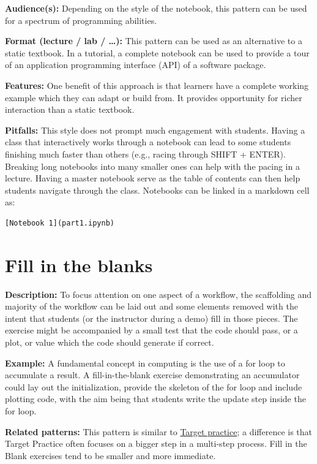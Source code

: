 \documentclass[]{book}
\begin{document}
\textbf{Audience(s):} Depending on the style of the notebook, this
pattern can be used for a spectrum of programming abilities.

\textbf{Format (lecture / lab / \ldots{}):} This pattern can be used as
an alternative to a static textbook. In a tutorial, a complete notebook
can be used to provide a tour of an application programming interface
(API) of a software package.

\textbf{Features:} One benefit of this approach is that learners have a
complete working example which they can adapt or build from. It provides
opportunity for richer interaction than a static textbook.

\textbf{Pitfalls:} This style does not prompt much engagement with
students. Having a class that interactively works through a notebook can
lead to some students finishing much faster than others (e.g., racing
through SHIFT + ENTER). Breaking long notebooks into many smaller ones
can help with the pacing in a lecture. Having a master notebook serve as
the table of contents can then help students navigate through the class.
Notebooks can be linked in a markdown cell as:

\begin{verbatim}
[Notebook 1](part1.ipynb)
\end{verbatim}

\hypertarget{fill-in-the-blanks}{\section{Fill in the
blanks}\label{fill-in-the-blanks}}

\textbf{Description:} To focus attention on one aspect of a workflow,
the scaffolding and majority of the workflow can be laid out and some
elements removed with the intent that students (or the instructor during
a demo) fill in those pieces. The exercise might be accompanied by a
small test that the code should pass, or a plot, or value which the code
should generate if correct.

\textbf{Example:} A fundamental concept in computing is the use of a for
loop to accumulate a result. A fill-in-the-blank exercise demonstrating
an accumulator could lay out the initialization, provide the skeleton of
the for loop and include plotting code, with the aim being that students
write the update step inside the for loop.

\textbf{Related patterns:} This pattern is similar to
\protect\hyperlink{target-practice}{Target practice}; a difference is
that Target Practice often focuses on a bigger step in a multi-step
process. Fill in the Blank exercises tend to be smaller and more
immediate.
\end{document}
